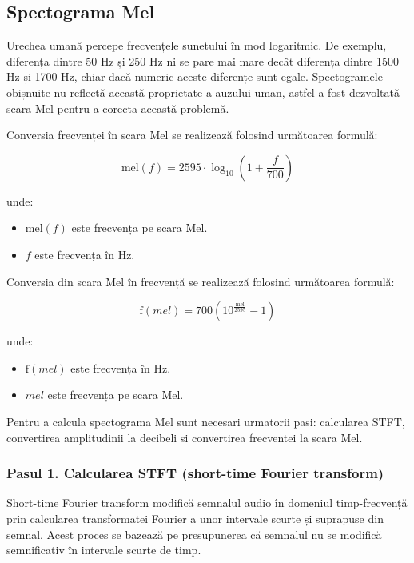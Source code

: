 \subsection{Spectograma Mel}

Urechea umană percepe frecvențele sunetului în mod logaritmic. De exemplu, diferența dintre 50 Hz și 250 Hz ni se pare mai mare decât diferența dintre 1500 Hz și 1700 Hz, chiar dacă numeric aceste diferențe sunt egale. Spectogramele obișnuite nu reflectă această proprietate a auzului uman, astfel a fost dezvoltată scara Mel pentru a corecta această problemă.

Conversia frecvenței în scara Mel se realizează folosind următoarea formulă:

\begin{equation}
\text{mel}(f) = 2595 \cdot \log_{10}\left(1 + \frac{f}{700}\right)
\label{eq:mel_formula}
\end{equation}

unde:
\begin{itemize}
    \item \( \text{mel}(f) \) este frecvența pe scara Mel.
    \item \( f \) este frecvența în Hz.
\end{itemize}

Conversia din scara Mel în frecvență se realizează folosind următoarea formulă:

\begin{equation}
\text{f}(mel) = 700 \left(10^{\frac{\text{mel}}{2595}} - 1\right)
\label{eq:inverse_mel_formula}
\end{equation}

unde:
\begin{itemize}
    \item \( \text{f}(mel) \) este frecvența în Hz.
    \item \( mel \) este frecvența pe scara Mel.
\end{itemize}

Pentru a calcula spectograma Mel sunt necesari urmatorii pasi: calcularea STFT, convertirea amplitudinii la decibeli si convertirea frecventei la scara Mel.

\subsubsection{Pasul 1. Calcularea STFT (short-time Fourier transform)}

Short-time Fourier transform modifică semnalul audio în domeniul timp-frecvență prin calcularea transformatei Fourier a unor intervale scurte și suprapuse din semnal. Acest proces se bazează pe presupunerea că semnalul nu se modifică semnificativ în intervale scurte de timp.

